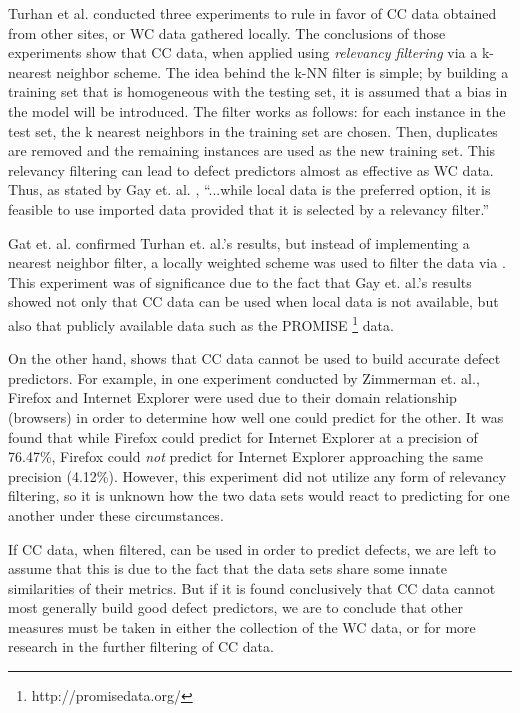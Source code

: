 \documentclass{sig-alternate}
\begin{document}
Turhan et al. conducted three experiments to rule in favor of CC data obtained from other sites, or WC data gathered locally. The conclusions of those experiments show that CC data, when applied using {\em relevancy filtering} via a k-nearest neighbor scheme. The idea behind the k-NN filter is simple; by building a training set that is homogeneous with the testing set, it is assumed that a bias in the model will be introduced. The filter works as follows: for each instance in the test set, the k nearest neighbors in the training set are chosen. Then, duplicates are removed and the remaining instances are used as the new training set. This relevancy filtering can lead to defect predictors almost as effective as WC data. Thus, as stated by Gay et. al. \cite{gay09}, ``...while local data is the preferred option, it is feasible to use imported data provided that it is selected by a relevancy filter.''

Gat et. al. confirmed Turhan et. al.'s results, but instead of implementing a nearest neighbor filter, a locally weighted scheme was used to filter the data via \cite{hallLWL}. This experiment was of significance due to the fact that Gay et. al.'s results showed not only that CC data can be used when local data is not available, but also that publicly available data such as the PROMISE \footnote{http://promisedata.org/} data.

On the other hand, \cite{zimmerman09} shows that CC data cannot be used to build accurate defect predictors. For example, in one experiment conducted by Zimmerman et. al., Firefox and Internet Explorer were used due to their domain relationship (browsers) in order to determine how well one could predict for the other. It was found that while Firefox could predict for Internet Explorer at a precision of 76.47\%, Firefox could {\em not} predict for Internet Explorer approaching the same precision (4.12\%). However, this experiment did not utilize any form of relevancy filtering, so it is unknown how the two data sets would react to predicting for one another under these circumstances. 

If CC data, when filtered, can be used in order to predict defects, we are left to assume that this is due to the fact that the data sets share some innate similarities of their metrics. But if it is found conclusively that CC data cannot most generally build good defect predictors, we are to conclude that other measures must be taken in either the collection of the WC data, or for more research in the further filtering of CC data.
\end{document}
